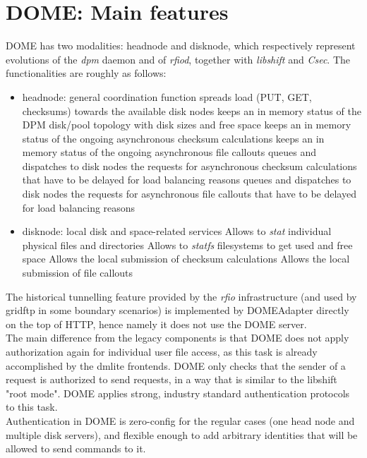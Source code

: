 \documentclass[a4paper,10pt]{scrreprt}
\begin{document}
\section{DOME: Main features}
DOME has two modalities: headnode and disknode, which respectively represent evolutions of the \textit{dpm} daemon and of \textit{rfiod}, together with \textit{libshift} and \textit{Csec}.
The functionalities are roughly as follows:
\begin{itemize}
 \item headnode: general coordination function
 \subitem spreads load (PUT, GET, checksums) towards the available disk nodes
 \subitem keeps an in memory status of the DPM disk/pool topology with disk sizes and free space
 \subitem keeps an in memory status of the ongoing asynchronous checksum calculations
 \subitem keeps an in memory status of the ongoing asynchronous file callouts
 \subitem queues and dispatches to disk nodes the requests for asynchronous checksum calculations that have to be delayed for load balancing reasons
 \subitem queues and dispatches to disk nodes the requests for asynchronous file callouts that have to be delayed for load balancing reasons

 \item disknode: local disk and space-related services
 \subitem Allows to \textit{stat} individual physical files and directories
 \subitem Allows to \textit{statfs} filesystems to get used and free space
 \subitem Allows the local submission of checksum calculations
 \subitem Allows the local submission of file callouts
\end{itemize}

The historical tunnelling feature provided by the \textit{rfio} infrastructure (and used by gridftp in some boundary scenarios)
is implemented by DOMEAdapter directly on the top of HTTP, hence namely it does not use the DOME server.\\


The main difference from the legacy components is that DOME does not apply authorization again for individual user file
access, as this task is already accomplished by the dmlite frontends. DOME only checks that the sender of a request is authorized to
send requests, in a way that is similar to the libshift "root mode". DOME applies strong, industry standard authentication protocols to this task.\\
Authentication in DOME is zero-config for the regular cases (one head node and multiple disk servers), and flexible enough
to add arbitrary identities that will be allowed to send commands to it.\\
\end{document}
